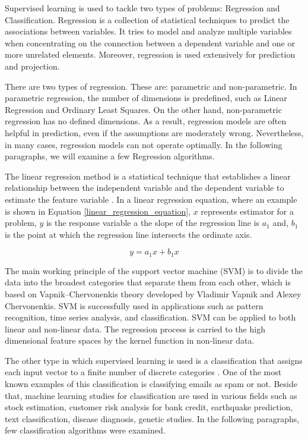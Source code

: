 Supervised learning is used to tackle two types of problems: Regression and Classification. Regression is a collection of statistical techniques to predict the associations between variables. It tries to model and analyze multiple variables when concentrating on the connection between a dependent variable and one or more unrelated elements. Moreover, regression is used extensively for prediction and projection.

There are two types of regression. These are: parametric and non-parametric. In parametric regression, the number of dimensions is predefined, such as Linear Regression and Ordinary Least Squares. On the other hand, non-parametric regression has no defined dimensions. As a result, regression models are often helpful in prediction, even if the assumptions are moderately wrong. Nevertheless, in many cases, regression models can not operate optimally. In the following paragraphs, we will examine a few Regression algorithms.

The linear regression method is a statistical technique that establishes a linear relationship between the independent variable and the dependent variable to estimate the feature variable \cite{tan2016introduction}. In a linear regression equation, where an example is shown in Equation \ref{linear_regression_equation}, \(x\) represents estimator for a problem, \(y\) is the response variable a the slope of the regression line is \(a_1\) and, \(b_1\) is the point at which the regression line intersects the ordinate axis.

\begin{equation} \label{linear_regression_equation}
y = a_1x + b_1x
\end{equation}

The main working principle of the support vector machine (SVM) is to divide the data into the broadest categories that separate them from each other, which is based on Vapnik–Chervonenkis theory developed by Vladimir Vapnik and Alexey Chervonenkis. SVM is successfully used in applications such as pattern recognition, time series analysis, and classification. SVM can be applied to both linear and non-linear data. The regression process is carried to the high dimensional feature spaces by the kernel function in non-linear data.

The other type in which supervised learning is used is a classification that assigns each input vector to a finite number of discrete categories \cite{harrington2012machine}. One of the most known examples of this classification is classifying emails as spam or not. Beside that, machine learning studies for classification are used in various fields such as stock estimation, customer risk analysis for bank credit, earthquake prediction, text classification, disease diagnosis, genetic studies. In the following paragraphs, few classification algorithms were examined.

